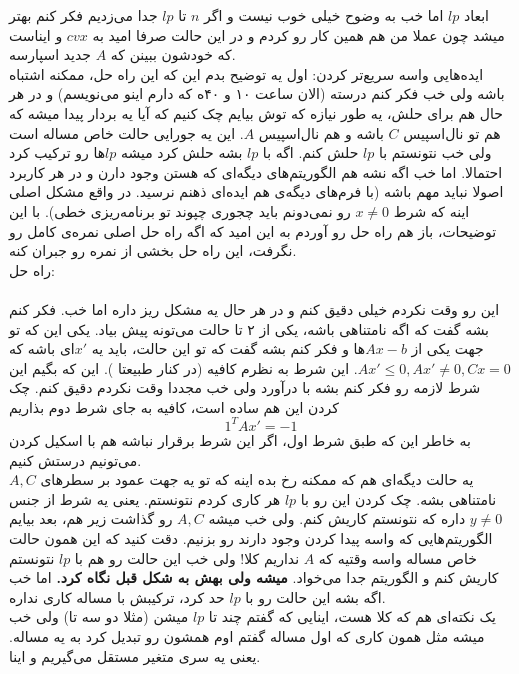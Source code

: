 ابعاد
$lp$
اما خب به وضوح خیلی خوب نیست و اگر $n$ تا $lp$ جدا می‌زدیم فکر کنم بهتر میشد چون عملا من هم همین کار رو کردم و در این حالت صرفا امید به $cvx$ و ایناست که خودشون ببینن که $A$ جدید اسپارسه.\\
ایده‌هایی واسه سریع‌تر کردن: 
اول یه توضیح بدم این که این راه حل، ممکنه اشتباه باشه ولی خب فکر کنم درسته (الان ساعت ۱۰ و ۴۰ه که دارم اینو می‌نویسم) و در هر حال هم برای حلش، یه 
‌طور
نیازه که توش بیایم چک کنیم که آیا یه بردار پیدا میشه که هم تو نال‌اسپیس $C$ باشه و هم نال‌اسپیس $A$. این یه جورایی حالت خاص مساله است ولی خب نتونستم با $lp$ حلش کنم. اگه با $lp$ بشه حلش کرد میشه $lp$‌ها رو ترکیب کرد احتمالا. اما خب اگه نشه هم الگوریتم‌های دیگه‌ای که هستن وجود دارن و در هر کاربرد
اصولا نباید مهم باشه (با فرم‌های دیگه‌ی
هم ایده‌ای ذهنم نرسید. در واقع مشکل اصلی اینه که شرط $x \ne 0$ رو نمی‌دونم باید چجوری چپوند تو برنامه‌ریزی خطی). با این توضیحات، باز هم راه حل رو آوردم به این امید که اگه راه حل اصلی نمره‌ی کامل رو نگرفت، این راه حل بخشی از نمره رو جبران کنه.\\
راه حل:\\
\\این رو وقت نکردم خیلی دقیق کنم و در هر حال یه مشکل ریز داره اما خب. فکر کنم بشه گفت که اگه نامتناهی باشه، یکی از ۲ تا حالت می‌تونه پیش بیاد. یکی این که تو جهت یکی از 
$Ax - b$‌ها
و فکر کنم بشه گفت که تو این حالت، باید یه $x'$ای باشه که 
$Ax' \le 0, Ax' \ne 0, Cx = 0$.
این شرط به نظرم کافیه (در کنار
طبیعتا
).
این که بگیم این شرط لازمه رو فکر کنم بشه با 
درآورد ولی خب مجددا وقت نکردم دقیق کنم.
چک کردن این هم ساده است، کافیه به جای شرط دوم بذاریم
\[
1^TAx' = -1
\]
به خاطر این که طبق شرط اول، اگر این شرط برقرار نباشه هم با اسکیل کردن می‌تونیم درستش کنیم.\\
یه حالت دیگه‌ای هم که ممکنه رخ بده اینه که تو یه جهت عمود بر سطر‌های $A, C$ نامتناهی بشه. چک کردن این رو با $lp$ هر کاری کردم نتونستم. یعنی یه شرط از جنس $y\ne0$ داره که نتونستم کاریش کنم. ولی خب میشه $A ,C$ رو گذاشت زیر هم، بعد بیایم الگوریتم‌هایی که واسه پیدا کردن 
وجود دارند رو بزنیم. دقت کنید که این همون حالت خاص مساله واسه وقتیه که $A$ نداریم کلا! ولی خب این حالت رو هم با $lp$ نتونستم کاریش کنم و الگوریتم جدا می‌خواد. 
\textbf{میشه ولی بهش به شکل 
قبل
نگاه کرد.
}
 اما خب اگه بشه این حالت رو با $lp$ حد کرد، ترکیبش با مساله کاری نداره.\\
یک نکته‌ای هم که کلا هست، اینایی که گفتم چند تا $lp$ میشن (مثلا دو سه تا) ولی خب میشه مثل همون کاری که اول مساله گفتم اوم همشون رو تبدیل کرد به یه مساله. یعنی یه سری متغیر مستقل می‌گیریم و اینا.
